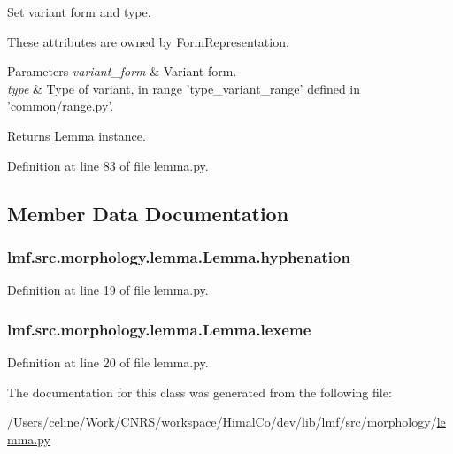 Set variant form and type. 

These attributes are owned by Form\+Representation. 
\begin{DoxyParams}{Parameters}
{\em variant\+\_\+form} & Variant form. \\
\hline
{\em type} & Type of variant, in range 'type\+\_\+variant\+\_\+range' defined in '\hyperlink{range_8py}{common/range.\+py}'. \\
\hline
\end{DoxyParams}
\begin{DoxyReturn}{Returns}
\hyperlink{classlmf_1_1src_1_1morphology_1_1lemma_1_1_lemma}{Lemma} instance. 
\end{DoxyReturn}


Definition at line 83 of file lemma.\+py.



\subsection{Member Data Documentation}
\hypertarget{classlmf_1_1src_1_1morphology_1_1lemma_1_1_lemma_a225df7c63b5a3a654307bc2d24ed1937}{
\subsubsection[{hyphenation}]{\setlength{\rightskip}{0pt plus 5cm}lmf.\+src.\+morphology.\+lemma.\+Lemma.\+hyphenation}}\label{classlmf_1_1src_1_1morphology_1_1lemma_1_1_lemma_a225df7c63b5a3a654307bc2d24ed1937}


Definition at line 19 of file lemma.\+py.

\hypertarget{classlmf_1_1src_1_1morphology_1_1lemma_1_1_lemma_ab68007ef04c51304b92e3eefcf2f40c9}{
\subsubsection[{lexeme}]{\setlength{\rightskip}{0pt plus 5cm}lmf.\+src.\+morphology.\+lemma.\+Lemma.\+lexeme}}\label{classlmf_1_1src_1_1morphology_1_1lemma_1_1_lemma_ab68007ef04c51304b92e3eefcf2f40c9}


Definition at line 20 of file lemma.\+py.



The documentation for this class was generated from the following file\+:\begin{DoxyCompactItemize}
\item 
/\+Users/celine/\+Work/\+C\+N\+R\+S/workspace/\+Himal\+Co/dev/lib/lmf/src/morphology/\hyperlink{lemma_8py}{lemma.\+py}\end{DoxyCompactItemize}

